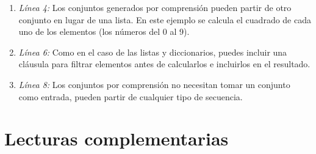 \begin{enumerate}

\item \emph{Línea 4:} Los conjuntos generados por comprensión pueden partir de otro conjunto en lugar de una lista. En este ejemplo se calcula el cuadrado de cada uno de los elementos (los números del 0 al 9).

\item \emph{Línea 6:} Como en el caso de las listas y diccionarios, puedes incluir una cláusula  para filtrar elementos antes de calcularlos e incluirlos en el resultado.

\item \emph{Línea 8:} Los conjuntos por comprensión no necesitan tomar un conjunto como entrada, pueden partir de cualquier tipo de secuencia.

\end{enumerate}

\section{Lecturas complementarias}

